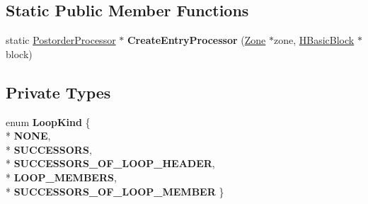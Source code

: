 \subsection*{Static Public Member Functions}
\begin{DoxyCompactItemize}
\item 
static \hyperlink{classv8_1_1internal_1_1_postorder_processor}{Postorder\+Processor} $\ast$ {\bfseries Create\+Entry\+Processor} (\hyperlink{classv8_1_1internal_1_1_zone}{Zone} $\ast$zone, \hyperlink{classv8_1_1internal_1_1_h_basic_block}{H\+Basic\+Block} $\ast$block)\hypertarget{classv8_1_1internal_1_1_postorder_processor_a93f8f020ad8ab4f2810d0c14c72380c9}{}\label{classv8_1_1internal_1_1_postorder_processor_a93f8f020ad8ab4f2810d0c14c72380c9}

\end{DoxyCompactItemize}
\subsection*{Private Types}
\begin{DoxyCompactItemize}
\item 
enum {\bfseries Loop\+Kind} \{ \\*
{\bfseries N\+O\+NE}, 
\\*
{\bfseries S\+U\+C\+C\+E\+S\+S\+O\+RS}, 
\\*
{\bfseries S\+U\+C\+C\+E\+S\+S\+O\+R\+S\+\_\+\+O\+F\+\_\+\+L\+O\+O\+P\+\_\+\+H\+E\+A\+D\+ER}, 
\\*
{\bfseries L\+O\+O\+P\+\_\+\+M\+E\+M\+B\+E\+RS}, 
\\*
{\bfseries S\+U\+C\+C\+E\+S\+S\+O\+R\+S\+\_\+\+O\+F\+\_\+\+L\+O\+O\+P\+\_\+\+M\+E\+M\+B\+ER}
 \}\hypertarget{classv8_1_1internal_1_1_postorder_processor_ab4f14b4cc00d02b8b2bd280567e78eac}{}\label{classv8_1_1internal_1_1_postorder_processor_ab4f14b4cc00d02b8b2bd280567e78eac}

\end{DoxyCompactItemize}
